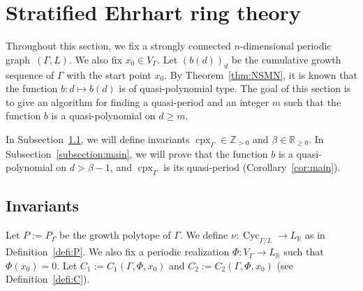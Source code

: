 \section{Stratified Ehrhart ring theory}\label{section:main}

Throughout this section, we fix a strongly connected $n$-dimensional periodic graph~$(\Gamma , L)$. 
We also fix $x_0 \in V_{\Gamma}$. 
Let $(b(d))_d$ be the cumulative growth sequence of $\Gamma$ with the start point $x_0$. 
By Theorem~\ref{thm:NSMN}, it is known that the function $b: d \mapsto b(d)$ is of quasi-polynomial type. 
The goal of this section is to give an algorithm for finding a quasi-period and an integer $m$ such that 
the function $b$ is a quasi-polynomial on $d \ge m$. 

In Subsection~\ref{subsection:inv}, 
we will define invariants $\operatorname{cpx}_{\Gamma} \in \mathbb{Z}_{>0}$ and $\beta \in \mathbb{R}_{\ge 0}$. 
In Subsection~\ref{subsection:main}, 
we will prove that the function $b$ is a quasi-polynomial on $d > \beta -1$, 
and $\operatorname{cpx}_{\Gamma}$ is its quasi-period 
(Corollary~\ref{cor:main}). 

\subsection{Invariants}\label{subsection:inv}

Let $P := P_{\Gamma}$ be the growth polytope of $\Gamma$. 
We define $\nu: \operatorname{Cyc}_{\Gamma /L} \to L_{\mathbb{R}}$ as in Definition~\ref{defi:P}. 
We also fix a periodic realization $\Phi: V_{\Gamma} \to L_{\mathbb{R}}$ such that $\Phi (x_0) = 0$. 
Let $C_1 := C_{1}(\Gamma, \Phi, x_0)$ and $C_2:= C_{2}(\Gamma, \Phi, x_0)$ (see Definition~\ref{defi:C}). 

